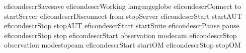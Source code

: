 \begin{gdreficon}
  \jb{}eficondescr{Save}{save}
  \jb{}eficondescr{Working language}{globe}
  \jb{}eficondescr{Connect to \gdserver}{startServer}
  \jb{}eficondescr{Disconnect from \gdserver}{stopServer}
  \jb{}eficondescr{Start \gdaut{}}{startAUT}
  \jb{}eficondescr{Stop \gdaut{}}{stopAUT}
  \jb{}eficondescr{Start \gdsuite{}}{startSuite}
  \jb{}eficondescr{Pause \gdsuite{}}{pause}
  \jb{}eficondescr{Stop \gdsuite{}}{stop}
  \jb{}eficondescr{Start observation mode}{cam}
  \jb{}eficondescr{Stop observation mode}{stopcam}
  \jb{}eficondescr{Start \gdomm{}}{startOM}
  \jb{}eficondescr{Stop \gdomm{}}{stopOM}
\end{gdreficon}
